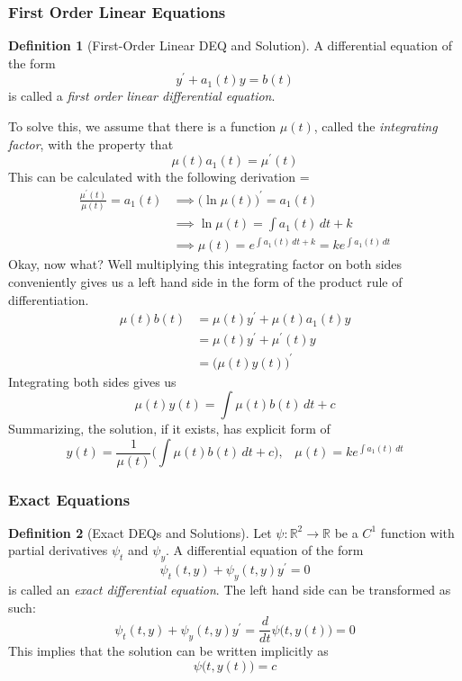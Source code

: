 \documentclass{article}
\theoremstyle{remark}
\theoremstyle{definition}
\newtheorem{definition}{Definition}[section]
\begin{document}
\subsubsection{First Order Linear Equations}
\begin{definition}[First-Order Linear DEQ and Solution]
A differential equation of the form 
\[y^\prime + a_1 (t) y = b(t)\]
is called a \textit{first order linear differential equation}. 

To solve this, we assume that there is a function $\mu (t)$, called the \textit{integrating factor}, with the property that 
\[\mu(t) a_1 (t) = \mu^\prime (t)\]
This can be calculated with the following derivation =
\begin{align*}
    \frac{\mu^\prime (t)}{\mu (t)} = a_1 (t) & \implies \big( \ln{\mu(t)}\big)^\prime = a_1 (t) \\
    & \implies \ln{\mu(t)} = \int a_1 (t) \, dt + k \\
    & \implies \mu(t) = e^{\int a_1(t)\,dt + k} = k e^{\int a_1 (t) \,dt}
\end{align*}
Okay, now what? Well multiplying this integrating factor on both sides conveniently gives us a left hand side in the form of the product rule of differentiation. 
\begin{align*}
     \mu(t) b(t) & = \mu(t) y^\prime + \mu(t) a_1 (t) y \\
     & = \mu(t) y^\prime + \mu^\prime (t) y \\
     & = \big( \mu(t) y(t) \big)^\prime
\end{align*}
Integrating both sides gives us 
\[\mu(t) y(t) = \int \mu(t) b(t) \,dt + c\]
Summarizing, the solution, if it exists, has explicit form of
\[y(t) = \frac{1}{\mu(t)} \bigg(\int \mu(t) b(t) \,dt + c\bigg), \;\;\; \mu(t) = k e^{\int a_1 (t)\,dt}\]
\end{definition}

\subsubsection{Exact Equations}
\begin{definition}[Exact DEQs and Solutions]
Let $\psi: \mathbb{R}^2 \longrightarrow \mathbb{R}$ be a $C^1$ function with partial derivatives $\psi_t$ and $\psi_y$. A differential equation of the form 
\[\psi_t (t, y) + \psi_y (t, y) y^\prime = 0\]
is called an \textit{exact differential equation}. The left hand side can be transformed as such: 
\[\psi_t (t, y) + \psi_y (t, y) y^\prime = \frac{d}{dt} \psi \big( t, y(t)\big) = 0\]
This implies that the solution can be written implicitly as 
\[\psi \big(t, y(t)\big) = c\]
\end{definition}
\end{document}

